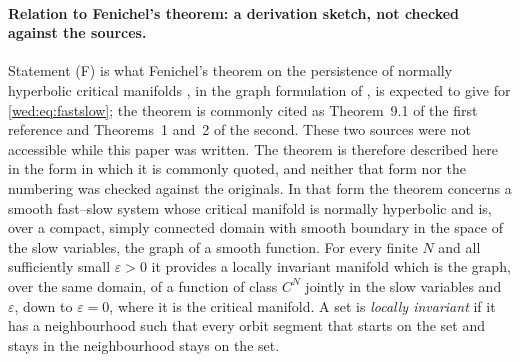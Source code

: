 \paragraph{Relation to Fenichel's theorem: a derivation sketch, not checked against the sources.}
Statement \textup{(F)} is what Fenichel's theorem on the persistence of normally hyperbolic critical manifolds \cite{Fenichel79}, in the graph formulation of \cite{Jones95}, is expected to give for \eqref{wed:eq:fastslow}; the theorem is commonly cited as Theorem~9.1 of the first reference and Theorems~1 and~2 of the second. These two sources were not accessible while this paper was written. The theorem is therefore described here in the form in which it is commonly quoted, and neither that form nor the numbering was checked against the originals. In that form the theorem concerns a smooth fast--slow system whose critical manifold is normally hyperbolic and is, over a compact, simply connected domain with smooth boundary in the space of the slow variables, the graph of a smooth function. For every finite $N$ and all sufficiently small $\varepsilon>0$ it provides a locally invariant manifold which is the graph, over the same domain, of a function of class $C^N$ jointly in the slow variables and $\varepsilon$, down to $\varepsilon=0$, where it is the critical manifold. A set is \emph{locally invariant} if it has a neighbourhood such that every orbit segment that starts on the set and stays in the neighbourhood stays on the set.

